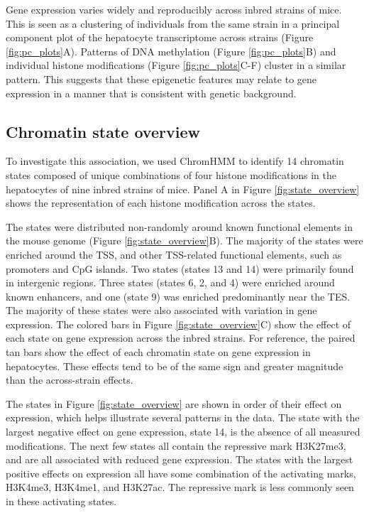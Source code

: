 \documentclass[10pt,letterpaper]{article}
\begin{document}
Gene expression varies widely and reproducibly across inbred strains of
mice. This is seen as a clustering of individuals from the same strain
in a principal component plot of the hepatocyte transcriptome across
strains (Figure \ref{fig:pc_plots}A). Patterns of DNA methylation
(Figure \ref{fig:pc_plots}B) and individual histone modifications
(Figure \ref{fig:pc_plots}C-F) cluster in a similar pattern. This
suggests that these epigenetic features may relate to gene expression in
a manner that is consistent with genetic background.

\hypertarget{chromatin-state-overview}{%
\subsection{Chromatin state overview}\label{chromatin-state-overview}}

To investigate this association, we used ChromHMM to identify 14
chromatin states composed of unique combinations of four histone
modifications in the hepatocytes of nine inbred strains of mice. Panel A
in Figure \ref{fig:state_overview} shows the representation of each
histone modification across the states.

The states were distributed non-randomly around known functional
elements in the mouse genome (Figure \ref{fig:state_overview}B). The
majority of the states were enriched around the TSS, and other
TSS-related functional elements, such as promoters and CpG islands. Two
states (states 13 and 14) were primarily found in intergenic regions.
Three states (states 6, 2, and 4) were enriched around known enhancers,
and one (state 9) was enriched predominantly near the TES. The majority
of these states were also associated with variation in gene expression.
The colored bars in Figure \ref{fig:state_overview}C) show the effect of
each state on gene expression across the inbred strains. For reference,
the paired tan bars show the effect of each chromatin state on gene
expression in hepatocytes. These effects tend to be of the same sign and
greater magnitude than the across-strain effects.

The states in Figure \ref{fig:state_overview} are shown in order of
their effect on expression, which helps illustrate several patterns in
the data. The state with the largest negative effect on gene expression,
state 14, is the absence of all measured modifications. The next few
states all contain the repressive mark H3K27me3, and are all associated
with reduced gene expression. The states with the largest positive
effects on expression all have some combination of the activating marks,
H3K4me3, H3K4me1, and H3K27ac. The repressive mark is less commonly seen
in these activating states.
\end{document}
